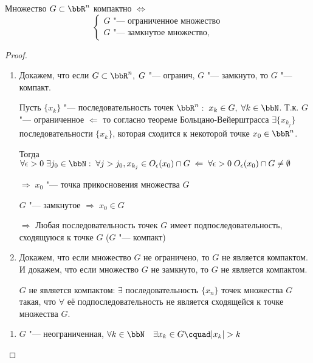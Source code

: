 \begin{thm}
Множество $G \subset \bbR^n$ компактно $\Leftrightarrow$
\begin{equation}
\begin{cases}
G \textit{ "--- ограниченное множество} \\
G \textit{ "--- замкнутое множество},
\end{cases}
\end{equation}
\end{thm}

\begin{proof}\leavevmode
\begin{enumerate}[wide, labelwidth=!, labelindent=\parindent]
\item
Докажем, что если $G \subset \bbR^n, \; G$ "--- огранич, $G$ "--- замкнуто, то $G$ "--- компакт.

Пусть $\{ x_k \}$ "--- последовательность точек $\bbR^n: \; x_k \in G, \; \forall k \in \bbN$. Т.к. $G$ "--- ограниченное $\Leftarrow$ то согласно теореме Больцано-Вейерштрасса $\exists \{ x_{k_j} \}$ последовательности $\{ x_k \}$, которая сходится к некоторой точке $x_0 \in \bbR^n$.

Тогда $\forall \epsilon > 0 \; \exists j_0 \in \bbN: \; \forall j > j_0, x_{k_j} \in O_\epsilon(x_0) \cap G \; \Leftarrow \; \forall \epsilon > 0 \; O_\epsilon(x_0) \cap G \not= \emptyset$

$\Rightarrow \; x_0$ "--- точка прикосновения множества $G$

$G$ "--- замкнутое $\Rightarrow \; x_0 \in G$

$\Rightarrow$ Любая последовательность точек $G$ имеет подпоследовательность, сходящуюся к точке $G$ ($G$ "--- компакт)

\item

Докажем, что если множество $G$ не ограничено, то $G$ не является компактом. И докажем, что если множество $G$ не замкнуто, то $G$ не является компактом.

$G$ не является компактом: $\exists$ последовательность $\{ x_n \}$ точек множества $G$ такая, что $\forall$ её подпоследовательность не является сходящейся к точке множества $G$. 
\end{enumerate}

\begin{enumerate}[wide, labelwidth=!, labelindent=\parindent]
\item

$G$ "--- неограниченная, $\forall k \in \bbN \quad \exists x_k \in G\cquad |x_k| > k$


\end{enumerate}
\end{proof}
